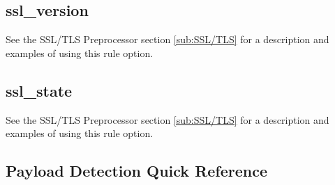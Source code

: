 \documentclass[english]{report}
\begin{document}
\subsection{ssl\_version}

See the SSL/TLS Preprocessor section \ref{sub:SSL/TLS} for a description and examples of
using this rule option.

\subsection{ssl\_state}

See the SSL/TLS Preprocessor section \ref{sub:SSL/TLS} for a description and examples of
using this rule option.

\subsection{Payload Detection Quick Reference}
\end{document}
